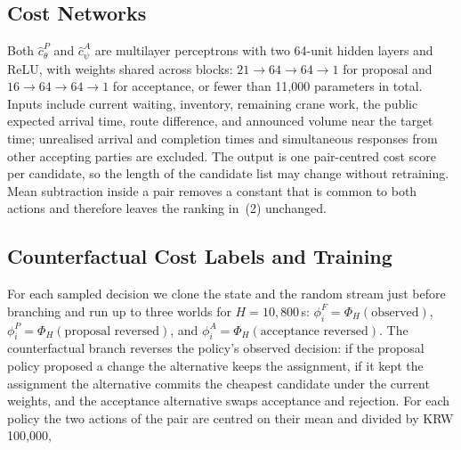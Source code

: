 \documentclass[a4paper]{llncs}
\begin{document}
\subsection{Cost Networks}
\label{sec:arch-models}
Both $\hat c^{P}_{\theta}$ and $\hat c^{A}_{\psi}$ are multilayer
perceptrons with two 64-unit hidden layers and ReLU, with weights shared
across blocks: $21\to64\to64\to1$ for proposal and $16\to64\to64\to1$
for acceptance, or fewer than 11{,}000 parameters in total. Inputs
include current waiting, inventory, remaining crane work, the public
expected arrival time, route difference, and announced volume near the
target time; unrealised arrival and completion times and simultaneous
responses from other accepting parties are excluded. The output is one
pair-centred cost score per candidate, so the length of the candidate
list may change without retraining. Mean subtraction inside a pair
removes a constant that is common to both actions and therefore leaves
the ranking in~(2) unchanged.

\subsection{Counterfactual Cost Labels and Training}
\label{sec:arch-labels}
For each sampled decision we clone the state and the random stream just
before branching and run up to three worlds for $H=10{,}800$\,s:
$\phi_i^F=\Phi_H(\text{observed})$,
$\phi_i^P=\Phi_H(\text{proposal reversed})$, and
$\phi_i^A=\Phi_H(\text{acceptance reversed})$. The counterfactual branch
reverses the policy's observed decision: if the proposal policy proposed
a change the alternative keeps the assignment, if it kept the assignment
the alternative commits the cheapest candidate under the current
weights, and the acceptance alternative swaps acceptance and rejection.
For each policy the two actions of the pair are centred on their mean
and divided by KRW 100{,}000,
\end{document}
